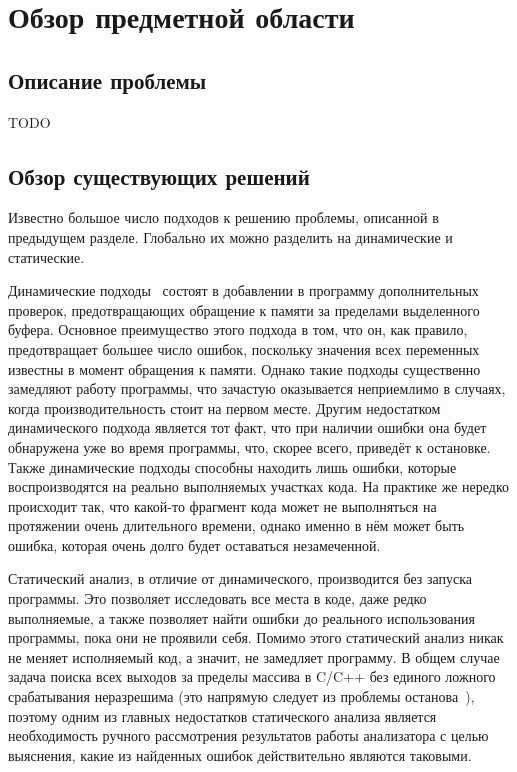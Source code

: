 \chapter{Обзор предметной области}

\section{Описание проблемы}

TODO

\section{Обзор существующих решений}

Известно большое число подходов к решению проблемы, описанной в
предыдущем разделе. Глобально их можно разделить на динамические и
статические.

Динамические подходы~\cite{cowan1998stackguard, ruwase2004practical,
  hastings1991purify} состоят в добавлении в программу дополнительных
проверок, предотвращающих обращение к памяти за пределами выделенного
буфера. Основное преимущество этого подхода в том, что он, как
правило, предотвращает большее число ошибок, поскольку значения всех
переменных известны в момент обращения к памяти. Однако такие подходы
существенно замедляют работу программы, что зачастую оказывается
неприемлимо в случаях, когда производительность стоит на первом
месте. Другим недостатком динамического подхода является тот факт, что
при наличии ошибки она будет обнаружена уже во время программы, что,
скорее всего, приведёт к остановке. Также динамические подходы
способны находить лишь ошибки, которые воспроизводятся на реально
выполняемых участках кода. На практике же нередко происходит так, что
какой-то фрагмент кода может не выполняться на протяжении очень
длительного времени, однако именно в нём может быть ошибка, которая
очень долго будет оставаться незамеченной.

Статический анализ, в отличие от динамического, производится без
запуска программы. Это позволяет исследовать все места в коде, даже
редко выполняемые, а также позволяет найти ошибки до реального
использования программы, пока они не проявили себя. Помимо этого
статический анализ никак не меняет исполняемый код, а значит, не
замедляет программу. В общем случае задача поиска всех выходов за
пределы массива в C/C++ без единого ложного срабатывания неразрешима
(это напрямую следует из проблемы
останова~\cite{turing1937computable}), поэтому одним из главных
недостатков статического анализа является необходимость ручного
рассмотрения результатов работы анализатора с целью выяснения, какие
из найденных ошибок действительно являются таковыми.

